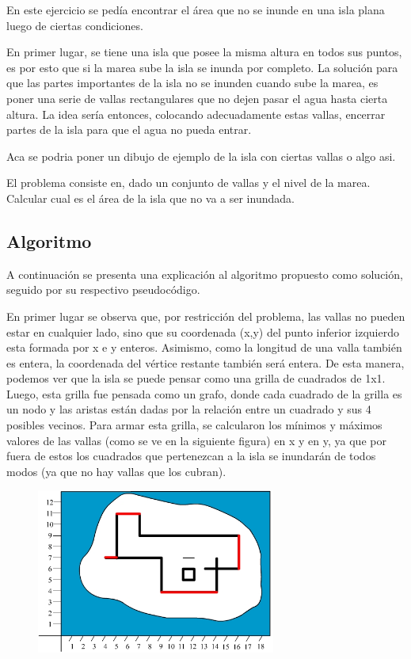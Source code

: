 \documentclass[a4paper, 12pt]{article}
\begin{document}
En este ejercicio se pedía encontrar el área que no se inunde en una isla plana luego de ciertas condiciones.

En primer lugar, se tiene una isla que posee la misma altura en todos sus puntos, es por esto que si la marea sube la isla se inunda por completo. La solución para que las partes importantes de la isla no se inunden cuando sube la marea, es poner una serie de vallas rectangulares que no dejen pasar el agua hasta cierta altura. La idea sería entonces, colocando adecuadamente estas vallas, encerrar partes de la isla para que el agua no pueda entrar.

Aca se podria poner un dibujo de ejemplo de la isla con ciertas vallas o algo asi.

El problema consiste en, dado un conjunto de vallas y el nivel de la marea. Calcular cual es el área de la isla que no va a ser inundada.

\subsection*{Algoritmo}

A continuación se presenta una explicación al algoritmo propuesto como solución, seguido por su respectivo pseudocódigo.

En primer lugar se observa que, por restricción del problema, las vallas no pueden estar en cualquier lado, sino que su coordenada (x,y) del punto inferior izquierdo esta formada por x e y enteros. Asimismo, como la longitud de una valla también es entera, la coordenada del vértice restante también será entera. De esta manera, podemos ver que la isla se puede pensar como una grilla de cuadrados de 1x1. Luego, esta grilla fue pensada como un grafo, donde cada cuadrado de la grilla es un nodo y las aristas están dadas por la relación entre un cuadrado y sus 4 posibles vecinos. Para armar esta grilla, se calcularon los mínimos y máximos valores de las vallas (como se ve en la siguiente figura) en x y en y, ya que por fuera de estos los cuadrados que pertenezcan a la isla se inundarán de todos modos (ya que no hay vallas que los cubran).


\begin{figure}[H]
\centering
\includegraphics[width=0.7\textwidth]{imagenes/im2_ej2.jpg} 
\end{figure}
\end{document}
